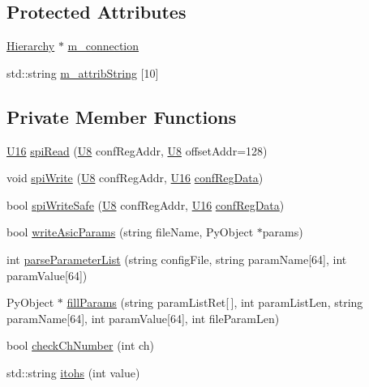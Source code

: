 \subsection*{Protected Attributes}
\begin{DoxyCompactItemize}
\item 
\hyperlink{classHierarchy}{Hierarchy} $\ast$ \hyperlink{classElement_abe3de7a5dbbc9a6dd2d7e012e5fdb266}{m\_\-connection}
\item 
std::string \hyperlink{classAttrib_a3414521d7a82476e874b25a5407b5e63}{m\_\-attribString} \mbox{[}10\mbox{]}
\end{DoxyCompactItemize}
\subsection*{Private Member Functions}
\begin{DoxyCompactItemize}
\item 
\hyperlink{LSDelayChipV1_8h_adf928e51a60dba0df29d615401cc55a8}{U16} \hyperlink{classICECALv3_aced41ce20a0853d6248b8df88412e57a}{spiRead} (\hyperlink{LSDelayChipV1_8h_a3cb25ca6f51f003950f9625ff05536fc}{U8} confRegAddr, \hyperlink{LSDelayChipV1_8h_a3cb25ca6f51f003950f9625ff05536fc}{U8} offsetAddr=128)
\item 
void \hyperlink{classICECALv3_aef00f02801dea4bda2093c930501dcdd}{spiWrite} (\hyperlink{LSDelayChipV1_8h_a3cb25ca6f51f003950f9625ff05536fc}{U8} confRegAddr, \hyperlink{LSDelayChipV1_8h_adf928e51a60dba0df29d615401cc55a8}{U16} \hyperlink{structconfRegData}{confRegData})
\item 
bool \hyperlink{classICECALv3_aa0b8358ea0be8e47a8aded5e1551787f}{spiWriteSafe} (\hyperlink{LSDelayChipV1_8h_a3cb25ca6f51f003950f9625ff05536fc}{U8} confRegAddr, \hyperlink{LSDelayChipV1_8h_adf928e51a60dba0df29d615401cc55a8}{U16} \hyperlink{structconfRegData}{confRegData})
\item 
bool \hyperlink{classICECALv3_a9d7c33e6d113e7f721dc848d28ab44d8}{writeAsicParams} (string fileName, PyObject $\ast$params)
\item 
int \hyperlink{classICECALv3_a313e8166af1ce26b4026f883ad900fb9}{parseParameterList} (string configFile, string paramName\mbox{[}64\mbox{]}, int paramValue\mbox{[}64\mbox{]})
\item 
PyObject $\ast$ \hyperlink{classICECALv3_ac006abc42a048308427f6801d783a407}{fillParams} (string paramListRet\mbox{[}$\,$\mbox{]}, int paramListLen, string paramName\mbox{[}64\mbox{]}, int paramValue\mbox{[}64\mbox{]}, int fileParamLen)
\item 
bool \hyperlink{classICECALv3_a8753a74558f988b346a3fe350c5bbad4}{checkChNumber} (int ch)
\item 
std::string \hyperlink{classICECALv3_a04b02e583f191bfce34d05132cd23834}{itohs} (int value)
\end{DoxyCompactItemize}
